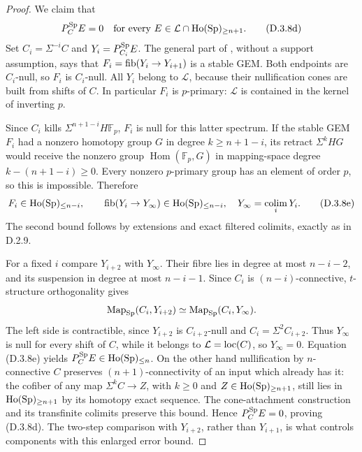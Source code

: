\begin{proof}
We claim that
\[
 P_C^{\mathrm{Sp}}E=0
       \quad\text{for every }E\in\mathcal L\cap\operatorname{Ho}(\mathrm{Sp})_{\geq n+1}.
 \tag{D.3.8d}
\]
Set $C_i=\Sigma^{-i}C$ and $Y_i=P_{C_i}^{\mathrm{Sp}}E$.
The general part of
\citet[Theorem~2.6]{Bousfield1996ULP}, without a support assumption,
says that $F_i=\operatorname{fib}(Y_i\to Y_{i+1})$ is a stable GEM.
Both endpoints are $C_i$-null, so $F_i$ is $C_i$-null.
All $Y_i$ belong to $\mathcal L$, because their nullification
cones are built from shifts of $C$. In particular $F_i$ is
$p$-primary: $\mathcal L$ is contained in the kernel of
inverting $p$.

Since $C_i$ kills $\Sigma^{n+1-i}H\mathbb F_p$, $F_i$ is
null for this latter spectrum. If the stable GEM $F_i$ had a
nonzero homotopy group $G$ in degree $k\geq n+1-i$, its retract
$\Sigma^kHG$ would receive the nonzero group
$\operatorname{Hom}(\mathbb F_p,G)$ in mapping-space degree
$k-(n+1-i)\geq0$. Every nonzero $p$-primary group has an
element of order $p$, so this is impossible. Therefore
\[
 F_i\in\operatorname{Ho}(\mathrm{Sp})_{\leq n-i},\qquad
 \operatorname{fib}(Y_i\to Y_\infty)\in\operatorname{Ho}(\mathrm{Sp})_{\leq n-i},
       \quad Y_\infty=\operatorname*{colim}_iY_i.
 \tag{D.3.8e}
\]
The second bound follows by extensions and exact filtered
colimits, exactly as in D.2.9.

For a fixed $i$ compare $Y_{i+2}$ with $Y_\infty$.
Their fibre lies in degree at most $n-i-2$, and its suspension
in degree at most $n-i-1$. Since $C_i$ is $(n-i)$-connective,
$t$-structure orthogonality gives
\[
 \operatorname{Map}_{\mathrm{Sp}}(C_i,Y_{i+2})
                 \simeq\operatorname{Map}_{\mathrm{Sp}}(C_i,Y_\infty).
\]
The left side is contractible, since $Y_{i+2}$ is
$C_{i+2}$-null and $C_i=\Sigma^2C_{i+2}$.
Thus $Y_\infty$ is null for every shift of $C$, while it belongs
to $\mathcal L=\operatorname{loc}(C)$, so $Y_\infty=0$.
Equation (D.3.8e) yields $P_C^{\mathrm{Sp}}E\in\operatorname{Ho}(\mathrm{Sp})_{\leq n}$.
On the other hand nullification by $n$-connective $C$ preserves
$(n+1)$-connectivity of an input which already has it:
the cofiber of any map $\Sigma^kC\to Z$, with $k\geq0$ and
$Z\in\operatorname{Ho}(\mathrm{Sp})_{\geq n+1}$, still lies in
$\operatorname{Ho}(\mathrm{Sp})_{\geq n+1}$ by its homotopy exact sequence.
The cone-attachment construction and its transfinite colimits
preserve this bound. Hence $P_C^{\mathrm{Sp}}E=0$, proving (D.3.8d).
The two-step comparison with $Y_{i+2}$, rather than $Y_{i+1}$,
is what controls components with this enlarged error bound.


\end{proof}
